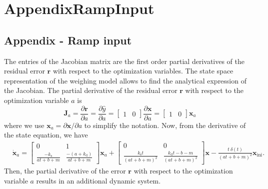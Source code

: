 \chapter{AppendixRampInput} \label{chap:AppendixRampInput}


\section{Appendix - Ramp input}


The entries of the Jacobian matrix are the first order partial derivatives of the residual error $\mathbf{r}$ with respect to the optimization variables.
The state space representation of the weighing model allows to find the analytical expression of the Jacobian.
The partial derivative of the residual error $\mathbf{r}$ with respect to the optimization variable $a$ is 
\begin{equation} \mathbf{J}_a=\dfrac{\partial \mathbf{r}}{\partial a} = \dfrac{\partial \widehat{y}}{\partial a} = \begin{bmatrix} 1 & 0  \end{bmatrix} \dfrac{\partial \mathbf{x}}{\partial a} = \begin{bmatrix} 1 & 0  \end{bmatrix} \mathbf{x}_a \end{equation}
where we use $\mathbf{x}_a = \partial \mathbf{x}/ \partial a$ to simplify the notation. 
Now, from the derivative of the state equation, we have
\begin{equation} \begin{aligned} 
    & \dot{\mathbf{x}}_a = \begin{bmatrix} 0 & 1 \\ \frac{-k_{\mathrm{s}}}{a t + b + m} & \frac{-(a + k_{\mathrm{d}})}{a t + b + m} \end{bmatrix} \mathbf{x}_a 
    + \begin{bmatrix} 0 & 0 \\ \frac{k_{\mathrm{s}} t}{(a t + b + m)^2} & \frac{k_{\mathrm{d}} t - b - m}{(a t + b + m)^2} \end{bmatrix} \mathbf{x} 
    - \frac{t \ \delta(t)}{(a t + b + m)^2} \mathbf{x}_{\text{ini}}   . 
\end{aligned} \end{equation}
Then, the partial derivative of the error $\mathbf{r}$ with respect to the optimization variable $a$ results in an additional dynamic system.

